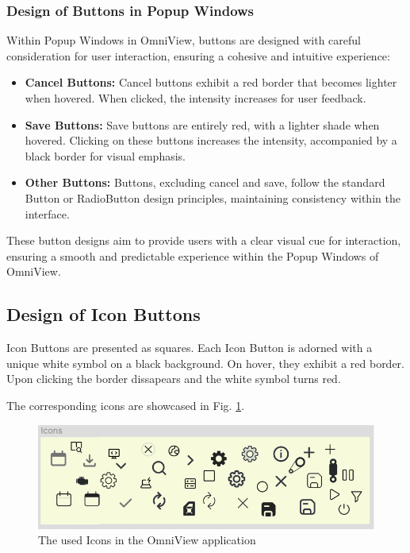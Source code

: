 \documentclass{scrreprt}
\begin{document}
\subsubsection{Design of Buttons in Popup Windows}\label{cap:Designprinciples_PopupWindowButtons}

Within Popup Windows in OmniView, buttons are designed with careful consideration for user interaction, ensuring a cohesive and intuitive experience:

\begin{itemize}
    \item \textbf{Cancel Buttons:} Cancel buttons exhibit a red border that becomes lighter when hovered. When clicked, the intensity increases for user feedback.
    
    \item \textbf{Save Buttons:} Save buttons are entirely red, with a lighter shade when hovered. Clicking on these buttons increases the intensity, accompanied by a black border for visual emphasis.
    
    \item \textbf{Other Buttons:} Buttons, excluding cancel and save, follow the standard Button or RadioButton design principles, maintaining consistency within the interface.
\end{itemize}

These button designs aim to provide users with a clear visual cue for interaction, ensuring a smooth and predictable experience within the Popup Windows of OmniView.

\subsection{Design of Icon Buttons}\label{cap:Designprinciples_IconButtons}

Icon Buttons are presented as squares. Each Icon Button is adorned with a unique white symbol on a black background. On hover, they exhibit a red border. Upon clicking the border dissapears and the white symbol turns red. 


The corresponding icons are showcased in Fig. \ref{fig: IconImages}.

\begin{figure}
    \includegraphics[width=.7\textwidth]{assets/pictures/Icons.png}
    \caption[]{The used Icons in the OmniView application}
    \label{fig: IconImages}
\end{figure}
\end{document}
